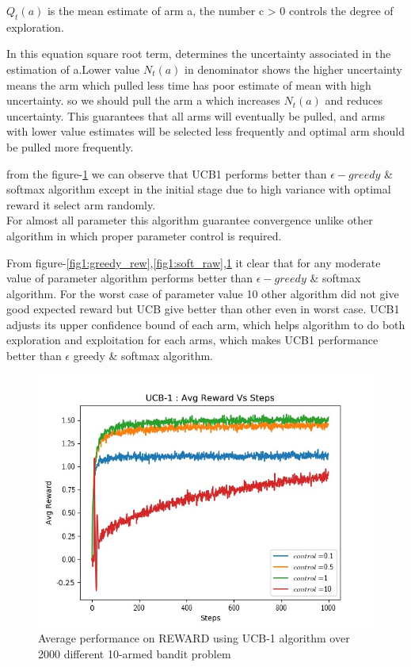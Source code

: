 \documentclass[preprint,12pt]{elsarticle}
\begin{document}
 	 $Q_t(a)$ is the mean estimate of arm a, 
 	 the number c > 0 controls the degree of exploration.
 	 
 	 In this equation square root term, determines the uncertainty associated in the estimation of a.Lower value $N_t(a)$ in denominator shows the higher uncertainty means the arm which pulled less time has poor estimate of mean with high uncertainty. so we should pull the arm a which increases $N_t(a)$ and reduces uncertainty. This guarantees that all arms will eventually be pulled, and arms with lower value
 	 estimates will be selected less frequently and optimal arm should be pulled more frequently.
 	 
 	 from the figure-\ref{fig1:ucb_raw} we can observe that UCB1 performs better than $\epsilon -greedy$ \& softmax algorithm except in the initial stage due to high variance with optimal reward it select arm randomly. \\
 	 
 	 For almost all parameter this algorithm guarantee convergence unlike other algorithm in which proper parameter control is required.  
 	 
 	 From figure-\ref{fig1:greedy_rew},\ref{fig1:soft_raw},\ref{fig1:ucb_raw} it clear that for any moderate value of parameter algorithm performs better than $\epsilon -greedy$ \& softmax algorithm. For the worst case of parameter value 10 other algorithm did not give good expected reward but UCB give better than other even in worst case. UCB1 adjusts its upper confidence bound of each arm, which helps algorithm to do both exploration and exploitation for each arms, which makes UCB1 performance better than $\epsilon$ greedy \& softmax algorithm.
 	
	 \begin{figure}[H]
		 	\centering
		 	\includegraphics[scale=0.7]{./reward_ucb.jpg}
		 	\hspace{0.25cm}
		 	\caption{Average performance on REWARD using UCB-1 algorithm over 2000 different 10-armed bandit problem}
		 	\label{fig1:ucb_raw}
	 \end{figure}
	 
\end{document}
